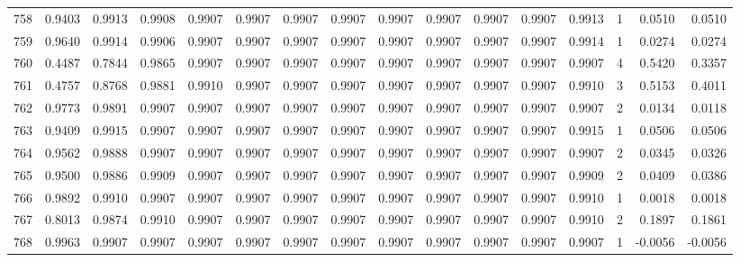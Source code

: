 \begin{tabular}{lrrrrrrrrrrrrrrr}
758 &      0.9403 &  0.9913 &  0.9908 &  0.9907 &  0.9907 &  0.9907 &  0.9907 &  0.9907 &  0.9907 &  0.9907 &   0.9907 &     0.9913 &      1 &                    0.0510 &                     0.0510 \\
759 &      0.9640 &  0.9914 &  0.9906 &  0.9907 &  0.9907 &  0.9907 &  0.9907 &  0.9907 &  0.9907 &  0.9907 &   0.9907 &     0.9914 &      1 &                    0.0274 &                     0.0274 \\
760 &      0.4487 &  0.7844 &  0.9865 &  0.9907 &  0.9907 &  0.9907 &  0.9907 &  0.9907 &  0.9907 &  0.9907 &   0.9907 &     0.9907 &      4 &                    0.5420 &                     0.3357 \\
761 &      0.4757 &  0.8768 &  0.9881 &  0.9910 &  0.9907 &  0.9907 &  0.9907 &  0.9907 &  0.9907 &  0.9907 &   0.9907 &     0.9910 &      3 &                    0.5153 &                     0.4011 \\
762 &      0.9773 &  0.9891 &  0.9907 &  0.9907 &  0.9907 &  0.9907 &  0.9907 &  0.9907 &  0.9907 &  0.9907 &   0.9907 &     0.9907 &      2 &                    0.0134 &                     0.0118 \\
763 &      0.9409 &  0.9915 &  0.9907 &  0.9907 &  0.9907 &  0.9907 &  0.9907 &  0.9907 &  0.9907 &  0.9907 &   0.9907 &     0.9915 &      1 &                    0.0506 &                     0.0506 \\
764 &      0.9562 &  0.9888 &  0.9907 &  0.9907 &  0.9907 &  0.9907 &  0.9907 &  0.9907 &  0.9907 &  0.9907 &   0.9907 &     0.9907 &      2 &                    0.0345 &                     0.0326 \\
765 &      0.9500 &  0.9886 &  0.9909 &  0.9907 &  0.9907 &  0.9907 &  0.9907 &  0.9907 &  0.9907 &  0.9907 &   0.9907 &     0.9909 &      2 &                    0.0409 &                     0.0386 \\
766 &      0.9892 &  0.9910 &  0.9907 &  0.9907 &  0.9907 &  0.9907 &  0.9907 &  0.9907 &  0.9907 &  0.9907 &   0.9907 &     0.9910 &      1 &                    0.0018 &                     0.0018 \\
767 &      0.8013 &  0.9874 &  0.9910 &  0.9907 &  0.9907 &  0.9907 &  0.9907 &  0.9907 &  0.9907 &  0.9907 &   0.9907 &     0.9910 &      2 &                    0.1897 &                     0.1861 \\
768 &      0.9963 &  0.9907 &  0.9907 &  0.9907 &  0.9907 &  0.9907 &  0.9907 &  0.9907 &  0.9907 &  0.9907 &   0.9907 &     0.9907 &      1 &                   -0.0056 &                    -0.0056 \\

\end{tabular}
